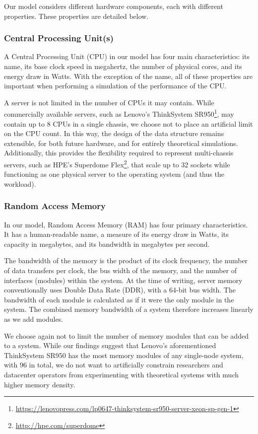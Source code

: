 \documentclass[11pt]{article}
\begin{document}
		Our model considers different hardware components, each with different properties.
		These properties are detailed below.

		\subsubsection{Central Processing Unit(s)}
			A Central Processing Unit (CPU) in our model has four main characteristics: its name, its base clock speed in megahertz, the number of physical cores, and its energy draw in Watts.
			With the exception of the name, all of these properties are important when performing a simulation of the performance of the CPU.
			
			A server is not limited in the number of CPUs it may contain.
			While commercially available servers, such as Lenovo's ThinkSystem SR950\footnote{\url{https://lenovopress.com/lp0647-thinksystem-sr950-server-xeon-sp-gen-1}}, may contain up to 8 CPUs in a single chassis, we choose not to place an artificial limit on the CPU count.
			In this way, the design of the data structure remains extensible, for both future hardware, and for entirely theoretical simulations.
			Additionally, this provides the flexibility required to represent multi-chassis servers, such as HPE's Superdome Flex\footnote{\url{http://hpe.com/superdome}}, that scale up to 32 sockets while functioning as one physical server to the operating system (and thus the workload).

		\subsubsection{Random Access Memory}
			In our model, Random Access Memory (RAM) has four primary characteristics.
			It has a human-readable name, a measure of its energy draw in Watts, its capacity in megabytes, and its bandwidth in megabytes per second.
			
			The bandwidth of the memory is the product of its clock frequency, the number of data transfers per clock, the bus width of the memory, and the number of interfaces (modules) within the system.
			At the time of writing, server memory conventionally uses Double Data Rate (DDR), with a 64-bit bus width.
			The bandwidth of each module is calculated as if it were the only module in the system.
			The combined memory bandwidth of a system therefore increases linearly as we add modules.
			
			We choose again not to limit the number of memory modules that can be added to a system.
			While our findings suggest that Lenovo's aforementioned ThinkSystem SR950 has the most memory modules of any single-node system, with 96 in total, we do not want to artificially constrain researchers and datacenter operators from experimenting with theoretical systems with much higher memory density.
\end{document}
